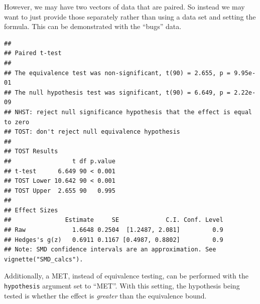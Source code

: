 \documentclass[]{interact}
\theoremstyle{plain}%
\theoremstyle{definition}
\theoremstyle{remark}
\newenvironment{Shaded}{\begin{snugshade}}{\end{snugshade}}
\newcommand{\AttributeTok}[1]{\textcolor[rgb]{0.77,0.63,0.00}{#1}}
\newcommand{\ConstantTok}[1]{\textcolor[rgb]{0.00,0.00,0.00}{#1}}
\newcommand{\DecValTok}[1]{\textcolor[rgb]{0.00,0.00,0.81}{#1}}
\newcommand{\FunctionTok}[1]{\textcolor[rgb]{0.00,0.00,0.00}{#1}}
\newcommand{\NormalTok}[1]{#1}
\newcommand{\OtherTok}[1]{\textcolor[rgb]{0.56,0.35,0.01}{#1}}
\newcommand{\SpecialCharTok}[1]{\textcolor[rgb]{0.00,0.00,0.00}{#1}}
\newcommand{\StringTok}[1]{\textcolor[rgb]{0.31,0.60,0.02}{#1}}
\begin{document}
\newpage

However, we may have two vectors of data that are paired. So instead we
may want to just provide those separately rather than using a data set
and setting the formula. This can be demonstrated with the ``bugs''
data.

\begin{Shaded}
\end{Shaded}

\begin{verbatim}
## 
## Paired t-test
## 
## The equivalence test was non-significant, t(90) = 2.655, p = 9.95e-01
## The null hypothesis test was significant, t(90) = 6.649, p = 2.22e-09
## NHST: reject null significance hypothesis that the effect is equal to zero 
## TOST: don't reject null equivalence hypothesis
## 
## TOST Results 
##                 t df p.value
## t-test      6.649 90 < 0.001
## TOST Lower 10.642 90 < 0.001
## TOST Upper  2.655 90   0.995
## 
## Effect Sizes 
##               Estimate     SE             C.I. Conf. Level
## Raw             1.6648 0.2504  [1.2487, 2.081]         0.9
## Hedges's g(z)   0.6911 0.1167 [0.4987, 0.8802]         0.9
## Note: SMD confidence intervals are an approximation. See vignette("SMD_calcs").
\end{verbatim}

\newpage

Additionally, a MET, instead of equivalence testing, can be performed
with the \texttt{hypothesis} argument set to ``MET''. With this setting,
the hypothesis being tested is whether the effect is \emph{greater} than
the equivalence bound.

\begin{Shaded}
\end{Shaded}
\end{document}
